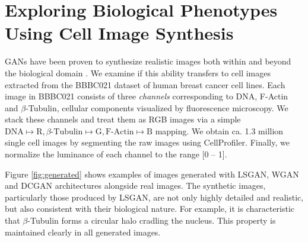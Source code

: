 \documentclass{article}
\begin{document}
\section{Exploring Biological Phenotypes Using Cell Image Synthesis}\label{synthesis}
GANs have been proven to synthesize realistic images both within and beyond the biological domain \cite{goodfellow2014generative,radford2015unsupervised,osokin2017gans}. We examine if this ability transfers to cell images extracted from the BBBC021 dataset of human breast cancer cell lines. Each image in BBBC021 consists of three \emph{channels} corresponding to DNA, F-Actin and $\beta$-Tubulin, cellular components visualized by fluorescence microscopy. We stack these channels and treat them as RGB images via a simple $\text{DNA} \mapsto \text{R}, \text{$\beta$-Tubulin} \mapsto \text{G}, \text{F-Actin} \mapsto \text{B}$ mapping. We obtain ca. 1.3 million single cell images by segmenting the raw images using CellProfiler. Finally, we normalize the luminance of each channel to the range [0 -- 1].


Figure \ref{fig:generated} shows examples of images generated with LSGAN, WGAN
and DCGAN architectures alongside real images. The synthetic images,
particularly those produced by LSGAN, are not only highly detailed and
realistic, but also consistent with their biological nature. For example, it is
characteristic that $\beta$-Tubulin forms a circular halo cradling the nucleus.
This property is maintained clearly in all generated images.
\end{document}
